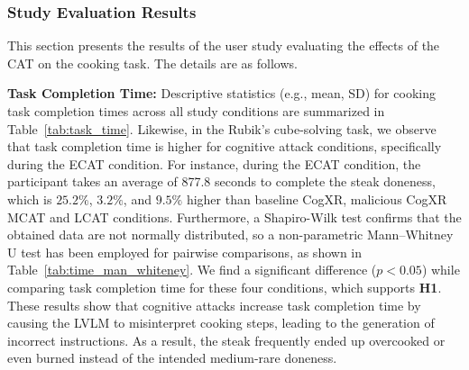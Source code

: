 \documentclass[sigconf,review,anonymous]{acmart}
\begin{document}





\subsubsection{Study Evaluation Results}
This section presents the results of the user study evaluating the effects of the CAT on the cooking task. The details are as follows.


\textbf{Task Completion Time:} Descriptive statistics (e.g., mean, SD) for cooking task completion times across all study conditions are summarized in Table~\ref{tab:task_time}. Likewise, in the Rubik's cube-solving task, we observe that task completion time is higher for cognitive attack conditions, specifically during the ECAT condition. For instance, during the ECAT condition, the participant takes an average of 877.8 seconds to complete the steak doneness, which is $25.2\%$, $3.2\%$, and $9.5\%$ higher than baseline CogXR, malicious CogXR MCAT and LCAT conditions. Furthermore, a Shapiro-Wilk test confirms that the obtained data are not normally distributed, so a non-parametric Mann–Whitney U test has been employed for pairwise comparisons, as shown in Table~\ref{tab:time_man_whiteney}. We find a significant difference ($p < 0.05$) while comparing task completion time for these four conditions, which supports \textbf{H1}. These results show that cognitive attacks increase task completion time by causing the LVLM to misinterpret cooking steps, leading to the generation of incorrect instructions. As a result, the steak frequently ended up overcooked or even burned instead of the intended medium-rare doneness.
\end{document}
